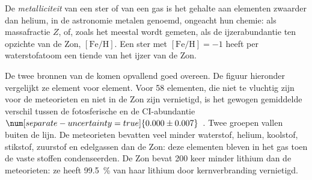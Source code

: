 \begin{definition}[Metalliciteit]\label{def:b3:origin-of-elements:metallicity}
De \emph{metalliciteit} van een ster of van een gas is
het gehalte aan elementen zwaarder dan helium, in de astronomie metalen
genoemd, ongeacht hun chemie: als massafractie $Z$, of, zoals het meestal
wordt gemeten, als de ijzerabundantie ten opzichte van de Zon, $[\mathrm{Fe/H}]$.
Een ster met $[\mathrm{Fe/H}] = -1$ heeft per waterstofatoom een tiende
van het ijzer van de Zon.
\end{definition}

De twee bronnen van de  komen opvallend goed overeen. De
figuur hieronder vergelijkt ze element voor element. Voor 58 elementen,
die niet te vluchtig zijn voor de meteorieten en niet in de Zon zijn
vernietigd, is het gewogen gemiddelde verschil tussen de fotosferische en
de CI-abundantie $\num[separate-uncertainty=true]{0.000 \pm 0.007}$~.
Twee groepen vallen buiten de lijn. De meteorieten bevatten veel minder
waterstof, helium, koolstof, stikstof, zuurstof en edelgassen dan de Zon:
deze elementen bleven in het gas toen de vaste stoffen condenseerden. De
Zon bevat \num{200} keer minder lithium dan de meteorieten: ze heeft
\qty{99.5}{\percent} van haar lithium door kernverbranding vernietigd.

